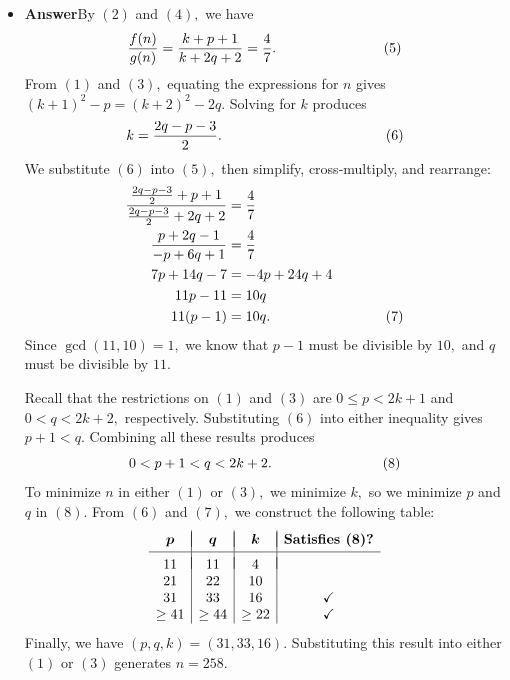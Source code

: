 \begin{enumerate}
\begin{itemize}
 It follows that $k^2<n<(k+2)^2,$ or 
 \[n=(k+2)^2-2q\hspace{38.25mm}(3)\] for some integer $q$ such that $0<q<2k+2.$ By recursion, we get
 \begin{align*} g\left((k+2)^2\right)&=k+2, \\ g\left((k+2)^2-2\right)&=k+4, \\ g\left((k+2)^2-4\right)&=k+6, \\ & \ \vdots \\ g\bigl(\phantom{ }\underbrace{(k+2)^2-2q}_{n}\phantom{ }\bigr)&=k+2q+2. \hspace{15.5mm}(4) \\ \end{align*}



        \item \textbf{Answer}By $(2)$ and $(4),$ we have 
 \[\frac{f(n)}{g(n)}=\frac{k+p+1}{k+2q+2}=\frac{4}{7}. \hspace{27mm}(5)\]From $(1)$ and $(3),$ equating the expressions for $n$ gives $(k+1)^2-p=(k+2)^2-2q.$ Solving for $k$ produces 
 \[k=\frac{2q-p-3}{2}. \hspace{41.25mm}(6)\]We substitute $(6)$ into $(5),$ then simplify, cross-multiply, and rearrange:
 \begin{align*} \frac{\frac{2q-p-3}{2}+p+1}{\frac{2q-p-3}{2}+2q+2}&=\frac{4}{7} \\ \frac{p+2q-1}{-p+6q+1}&=\frac{4}{7} \\ 7p+14q-7&=-4p+24q+4 \\ 11p-11&=10q \\ 11(p-1)&=10q. \hspace{29mm}(7) \end{align*}
Since $\gcd(11,10)=1,$ we know that $p-1$ must be divisible by $10,$ and $q$ must be divisible by $11.$ 

  Recall that the restrictions on $(1)$ and $(3)$ are $0\leq p<2k+1$ and $0<q<2k+2,$ respectively. Substituting $(6)$ into either inequality gives $p+1<q.$ Combining all these results produces 
 \[0<p+1<q<2k+2. \hspace{28mm}(8)\]To minimize $n$ in either $(1)$ or $(3),$ we minimize $k,$ so we minimize $p$ and $q$ in $(8).$ From $(6)$ and $(7),$ we construct the following table:
 \[\begin{array}{c|c|c|c} & & & \\ [-2.5ex] \boldsymbol{p} & \boldsymbol{q} & \boldsymbol{k} & \textbf{Satisfies }\boldsymbol{(8)?} \\ [0.5ex] \hline & & & \\ [-2ex] 11 & 11 & 4 & \\ 21 & 22 & 10 & \\ 31 & 33 & 16 & \checkmark \\ \geq41 & \geq44 & \geq22 & \checkmark \\ \end{array}\]Finally, we have $(p,q,k)=(31,33,16).$ Substituting this result into either $(1)$ or $(3)$ generates $n=\boxed{258}.$



\end{itemize}
\end{enumerate}
